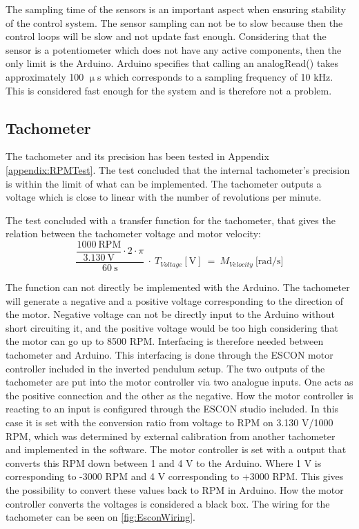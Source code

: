 The sampling time of the sensors is an important aspect when ensuring stability of the control system. The sensor sampling can not be to slow because then the control loops will be slow and not update fast enough. Considering that the sensor is a potentiometer which does not have any active components, then the only limit is the Arduino. Arduino specifies that calling an analogRead() takes approximately 100 $\upmu$s which corresponds to a sampling frequency of 10 kHz. This is considered fast enough for the system and is therefore not a problem. 

\subsection*{Tachometer}
The tachometer and its precision has been tested in Appendix \ref{appendix:RPMTest}. The test concluded that the internal tachometer's precision is within the limit of what can be implemented. The tachometer outputs a voltage which is close to linear with the number of revolutions per minute.

The test concluded with a transfer function for the tachometer, that gives the relation between the tachometer voltage and motor velocity:
\begin{equation}
\dfrac{\dfrac{1000\ \text{RPM}}{3.130\ \text{V}} \cdot 2 \cdot \pi}{60\ \text{s}}\ \cdot\ T_{Voltage}[\text{V}]\ =\ M_{Velocity}\ \text{[rad/s]}
\end{equation}


The function can not directly be implemented with the Arduino. The tachometer will generate a negative and a positive voltage corresponding to the direction of the motor. Negative voltage can not be directly input to the Arduino without short circuiting it, and the positive voltage would be too high considering that the motor can go up to 8500 RPM. Interfacing is therefore needed between tachometer and Arduino.
This interfacing is done through the ESCON motor controller included in the inverted pendulum setup. The two outputs of the tachometer are put into the motor controller via two analogue inputs. One acts as the positive connection and the other as the negative. How the motor controller is reacting to an input is configured through the ESCON studio included. In this case it is set with the conversion ratio from voltage to RPM on 3.130 V/1000 RPM, which was determined by external calibration from another tachometer and implemented in the software.  The motor controller is set with a output that converts this RPM down between 1 and 4 V to the Arduino. Where 1 V is corresponding to -3000 RPM and 4 V corresponding to +3000 RPM. This gives the possibility to convert these values back to RPM in Arduino. How the motor controller converts the voltages is considered a black box. The wiring for the tachometer can be seen on \autoref{fig:EsconWiring}. 

